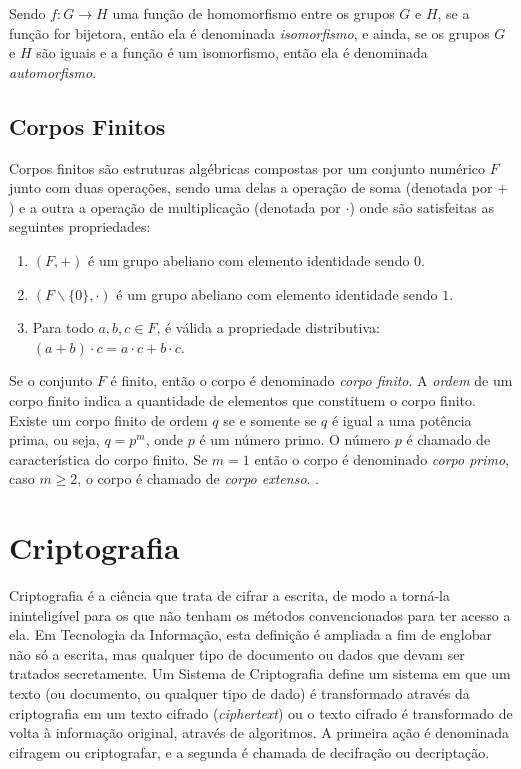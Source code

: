 Sendo $f: G \rightarrow H$ uma função de homomorfismo entre os grupos $G$ e $H$, se a função for bijetora, então ela é denominada \textit{isomorfismo}, e ainda, se os grupos $G$ e $H$ são iguais e a função é um isomorfismo, então ela é denominada \textit{automorfismo}\cite{Shokranian:2010}.

%
%
\subsection{Corpos Finitos}

Corpos finitos são estruturas algébricas compostas por um conjunto numérico $F$ junto com duas operações, sendo uma delas a operação de soma (denotada por $+$) e a outra a operação de multiplicação (denotada por $\cdot$) onde são satisfeitas as seguintes propriedades:\cite{Hankerson:2004}

\begin{enumerate}
\item $(F, +)$ é um grupo abeliano com elemento identidade sendo $0$.
\item $(F\backslash\{0\}, \cdot)$ é um grupo abeliano com elemento identidade sendo $1$.
\item Para todo $a, b, c \in F$, é válida a propriedade distributiva: $(a + b) \cdot c = a \cdot c + b \cdot c$.
\end{enumerate}

Se o conjunto \(F\) é finito, então o corpo é denominado \textit{corpo finito}. A \textit{ordem} de um corpo finito indica a quantidade de elementos que constituem o corpo finito. Existe um corpo finito de ordem \(q\) se e somente se \(q\) é igual a uma potência prima, ou seja, $q = p^{m}$, onde \(p\) é um número primo. O número \(p\) é chamado de característica do corpo finito. Se $m = 1$ então o corpo é denominado \textit{corpo primo}, caso $m \geq 2$, o corpo é chamado de \textit{corpo extenso}. \cite{Hankerson:2004}.

%
%
\section{Criptografia} \label{sec:criptografia}
Criptografia é a ciência que trata de cifrar a escrita, de modo a torná-la ininteligível para os que não tenham os métodos convencionados para ter acesso a ela. Em Tecnologia da Informação, esta definição é ampliada a fim de englobar não só a escrita, mas qualquer tipo de documento ou dados que devam ser tratados secretamente. Um Sistema de Criptografia define um sistema em que um texto (ou documento, ou qualquer tipo de dado) é transformado através da criptografia em um texto cifrado (\textit{ciphertext}) ou o texto cifrado é transformado de volta à informação original, através de algoritmos. A primeira ação é denominada cifragem ou criptografar, e a segunda é chamada de decifração ou decriptação. \cite{Portnoi:2005}

